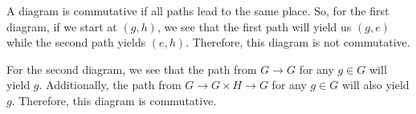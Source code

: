 \documentclass[12pt]{report}
\begin{document}

\sol A diagram is commutative if all paths lead to the same place. So, for the first diagram, if we start at $(g, h)$, we see that the first path will yield us $(g, e)$ while the second path yields $(e, h)$. Therefore, this diagram is not commutative.

For the second diagram, we see that the path from $G \to G$ for any $g \in G$ will yield $g$. Additionally, the path from $G \to G \times H \to G$ for any $g \in G$ will also yield $g$. Therefore, this diagram is commutative.
\end{document}
